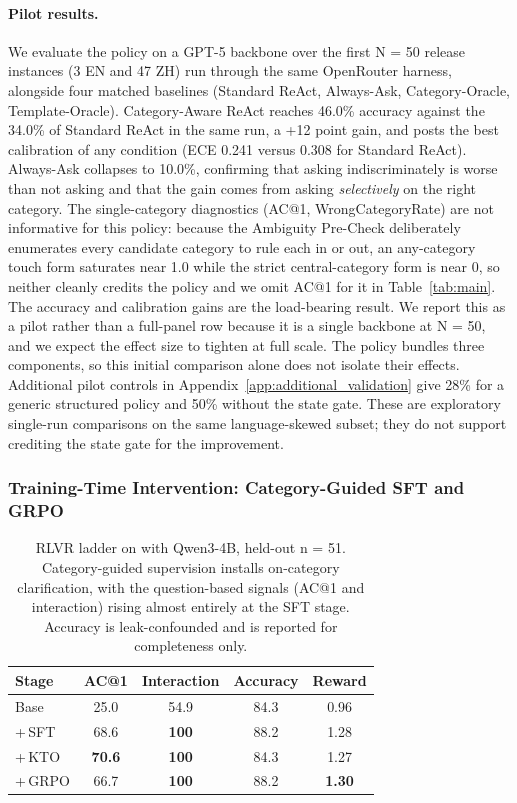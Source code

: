 \paragraph{Pilot results.}
We evaluate the policy on a GPT-5 backbone over the first N = 50 release instances (3 EN and 47 ZH) run
through the same OpenRouter harness, alongside four matched baselines (Standard ReAct,
Always-Ask, Category-Oracle, Template-Oracle). Category-Aware ReAct reaches 46.0\% accuracy
against the 34.0\% of Standard ReAct in the same run, a +12 point gain, and posts the
best calibration of any condition (ECE 0.241 versus 0.308 for Standard ReAct). Always-Ask
collapses to 10.0\%, confirming that asking indiscriminately is worse than not asking and
that the gain comes from asking \emph{selectively} on the right category. The single-category
diagnostics (AC@1, WrongCategoryRate) are not informative for this policy: because the
Ambiguity Pre-Check deliberately enumerates every candidate category to rule each in or out, an
any-category touch form saturates near 1.0 while the strict central-category form is near 0, so
neither cleanly credits the policy and we omit AC@1 for it in Table~\ref{tab:main}. The
accuracy and calibration gains are the load-bearing result. We report this as a pilot rather
than a full-panel row because it is a single backbone at N = 50, and we expect the effect
size to tighten at full scale. The policy bundles three components, so this initial comparison alone does not isolate their effects. Additional pilot controls in Appendix~\ref{app:additional_validation} give 28\% for a generic structured policy and 50\% without the state gate. These are exploratory single-run comparisons on the same language-skewed subset; they do not support crediting the state gate for the improvement.

\subsubsection{Training-Time Intervention: Category-Guided SFT and GRPO}
\label{sec:grpo}

\begin{table}[t]
\centering

\small
\begin{tabular}{@{}lcccc@{}}
\toprule
Stage & AC@1 & Interaction & Accuracy & Reward \\
\midrule
Base      & 25.0 & 54.9 & 84.3 & 0.96 \\
\;\;+\,SFT & 68.6 & \textbf{100} & 88.2 & 1.28 \\
\;\;+\,KTO               & \textbf{70.6} & \textbf{100} & 84.3 & 1.27 \\
\;\;+\,GRPO              & 66.7 & \textbf{100} & 88.2 & \textbf{1.30} \\
\bottomrule
\end{tabular}
\caption{RLVR ladder on \fininteract with Qwen3-4B, held-out n = 51. Category-guided supervision installs on-category clarification, with the question-based signals (AC@1 and interaction) rising almost entirely at the SFT stage. Accuracy is leak-confounded and is reported for completeness only.}
\label{tab:grpo}
\end{table}

